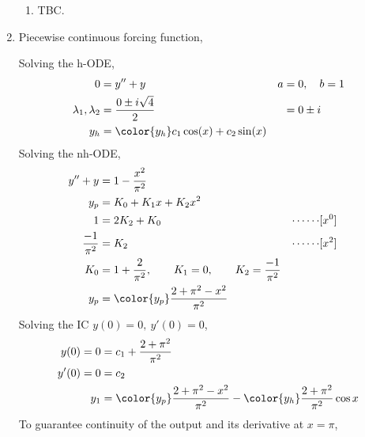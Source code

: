 \begin{enumerate}
\begin{enumerate}
              \item TBC.
          \end{enumerate}

    \item Piecewise continuous forcing function, \par
          Solving the h-ODE,
          \begin{align}
              0                        & = y'' + y                                 & a & = 0, \quad b = 1 \\
              \lambda_{1}, \lambda_{2} & = \frac{0 \pm i\sqrt{4}}{2}               &   & = 0 \pm i        \\
              y_{h}                    & = \color{y_h} c_{1}\cos(x) + c_{2}\sin(x)
          \end{align}
          Solving the nh-ODE,
          \begin{align}
              y'' + y             & = 1 - \frac{x^{2}}{\pi^{2}}                                                                           \\
              y_{p}               & = K_{0} + K_{1}x + K_{2}x^{2}                                                                         \\
              1                   & = 2K_{2} + K_{0}                                                             & \cdots\cdots & [x^{0}] \\
              \frac{-1}{\pi ^{2}} & = K_{2}                                                                      & \cdots\cdots & [x^{2}] \\
              K_{0}               & = 1 + \frac{2}{\pi^{2}}, \qquad K_{1} = 0, \qquad K_{2} = \frac{-1}{\pi^{2}}                          \\
              y_{p}               & = \color{y_p} \frac{2 + \pi^{2} - x^{2}}{\pi^{2}}
          \end{align}
          Solving the IC $ y(0) = 0,\ y'(0) = 0 $,
          \begin{align}
              y(0) = 0  & = c_{1} + \frac{2 + \pi^{2}}{\pi^{2}}                \\
              y'(0) = 0 & = c_{2}                                              \\
              y_{1}     & = {\color{y_p} \frac{2 + \pi^{2} - x^{2}}{\pi^{2} }}
              - {\color{y_h} \frac{2 + \pi^{2}}{\pi^{2}}\cos x}
          \end{align}
          To guarantee continuity of the output and its derivative at $ x = \pi $,

\end{enumerate}
